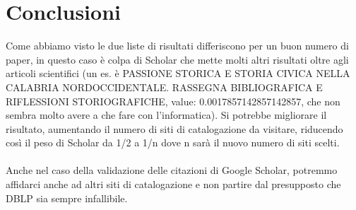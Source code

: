 \documentclass[12pt]{article}
\begin{document}
\section{Conclusioni}
Come abbiamo visto le due liste di risultati differiscono per un buon numero di paper, in questo caso \`e colpa di Scholar che mette molti altri risultati oltre agli articoli scientifici (un es. \`e PASSIONE STORICA E STORIA CIVICA NELLA CALABRIA NORDOCCIDENTALE. RASSEGNA BIBLIOGRAFICA E RIFLESSIONI STORIOGRAFICHE, value: 0.0017857142857142857, che non sembra molto avere a che fare con l'informatica). Si potrebbe migliorare il risultato, aumentando il numero di siti di catalogazione da visitare, riducendo cos\`i il peso di Scholar da 1/2 a 1/n dove n sar\`a il nuovo numero di siti scelti.\\\\
Anche nel caso della validazione delle citazioni di Google Scholar, potremmo affidarci anche ad altri siti di catalogazione e non partire dal presupposto che DBLP sia sempre infallibile.
\end{document}
